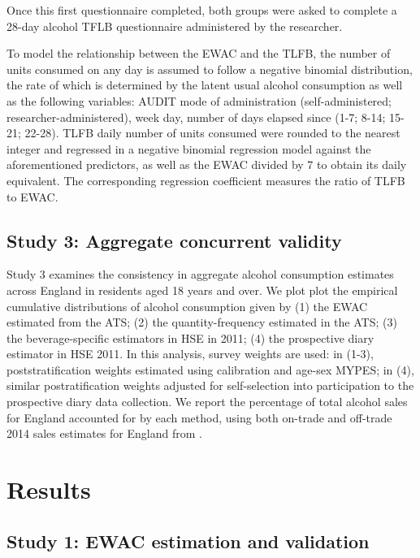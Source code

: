 \documentclass[]{article}
\begin{document}
Once this first questionnaire completed, both groups were asked to
complete a 28-day alcohol TFLB questionnaire administered by the
researcher.

To model the relationship between the EWAC and the TLFB, the number of
units consumed on any day is assumed to follow a negative binomial
distribution, the rate of which is determined by the latent usual
alcohol consumption as well as the following variables: AUDIT mode of
administration (self-administered; researcher-administered), week day,
number of days elapsed since (1-7; 8-14; 15-21; 22-28). TLFB daily
number of units consumed were rounded to the nearest integer and
regressed in a negative binomial regression model against the
aforementioned predictors, as well as the EWAC divided by 7 to obtain
its daily equivalent. The corresponding regression coefficient measures
the ratio of TLFB to EWAC.

\hypertarget{study-3-aggregate-concurrent-validity}{%
\subsection{Study 3: Aggregate concurrent
validity}\label{study-3-aggregate-concurrent-validity}}

Study 3 examines the consistency in aggregate alcohol consumption
estimates across England in residents aged 18 years and over. We plot
plot the empirical cumulative distributions of alcohol consumption given
by (1) the EWAC estimated from the ATS; (2) the quantity-frequency
estimated in the ATS; (3) the beverage-specific estimators in HSE in
2011; (4) the prospective diary estimator in HSE 2011. In this analysis,
survey weights are used: in (1-3), poststratification weights estimated
using calibration and age-sex MYPES; in (4), similar postratification
weights adjusted for self-selection into participation to the
prospective diary data collection. We report the percentage of total
alcohol sales for England accounted for by each method, using both
on-trade and off-trade 2014 sales estimates for England from
\citep{PHE2017}.

\hypertarget{results}{%
\section{Results}\label{results}}

\hypertarget{study-1-ewac-estimation-and-validation}{%
\subsection{Study 1: EWAC estimation and
validation}\label{study-1-ewac-estimation-and-validation}}
\end{document}
